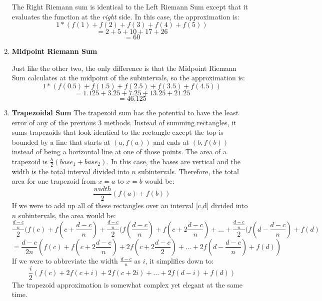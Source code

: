 \documentclass[../revisedmain.tex]{subfiles}
\begin{document}
\begin{enumerate}
\begin{center}
\begin{tikzpicture}
			\end{tikzpicture}
		\end{center}
		The Right Riemann sum is identical to the Left Riemann Sum except that it evaluates the function at the \textit{right} side. In this case, the approximation is:$$1*(f(1)+f(2)+f(3)+f(4)+f(5))$$$$=2+5+10+17+26$$$$=60$$
	\item \textbf{Midpoint Riemann Sum}
		\begin{center}
		\end{center}
		Just like the other two, the only difference is that the Midpoint Riemann Sum calculates at the midpoint of the subintervals, so the approximation is:$$1*(f(0.5)+f(1.5)+f(2.5)+f(3.5)+f(4.5))$$$$=1.125+3.25+7.25+13.25+21.25$$$$=46.125$$		
	\item \textbf{Trapezoidal Sum}
	The trapezoid sum has the potential to have the least error of any of the previous 3 methods. Instead of summing rectangles, it sums trapezoids that look identical to the rectangle except the top is bounded by a line that starts at $(a,f(a))$ and ends at $(b,f(b))$ instead of being a horizontal line at one of those points. The area of a trapezoid is $\displaystyle\frac{h}{2} (base_1+base_2)$. In this case, the bases are vertical and the width is the total interval divided into $n$ subintervals. Therefore, the total area for one trapezoid from $x=a$ to $x=b$ would be:$$\frac{width}{2} (f(a)+f(b))$$ If we were to add up all of these rectangles over an interval [c,d] divided into $n$ subintervals, the area would be:$$\frac{\frac{d-c}{n}}{2} (f(c)+f(c+\frac{d-c}{n})+\frac{\frac{d-c}{n}}{2} (f(\frac{d-c}{n})+f(c+2\frac{d-c}{n})+\dots+\frac{\frac{d-c}{n}}{2} (f(d-\frac{d-c}{n})+f(d)$$$$=\frac{d-c}{2n}\left(f(c)+f(c+2\frac{d-c}{n})+2f(c+2\frac{d-c}{2})+\dots+2f(d-\frac{d-c}{n})+f(d)\right)$$If we were to abbreviate the width $\displaystyle\frac{d-c}{n}$ as $i$, it simplifies down to:$$\frac{i}{2}\left(f(c)+2f(c+i)+2f(c+2i)+\dots+2f(d-i)+f(d)\right)$$The trapezoid approximation is somewhat complex yet elegant at the same time.
\end{enumerate}
\end{document}

